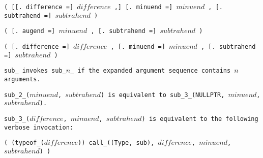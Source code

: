 
\s\s\s\tt{(} [[\tt{. difference =}] $difference$ \tt{,}]
[\tt{. minuend =}] $minuend$ \tt{,} [\tt{. subtrahend =}] $subtrahend$ \tt{)}

\s\tt{(} \phantom{[}[\tt{. augend =}]
$minuend$ \tt{,} [\tt{. subtrahend =}] $subtrahend$ \tt{)}

\s\tt{(} \phantom{[}[\tt{. difference =}] $difference$ \tt{,}\phantom{]}
[\tt{. minuend =}] $minuend$ \tt{,} [\tt{. subtrahend =}] $subtrahend$ \tt{)}


\tt{sub_} invokes \tt{sub_}$n$\_ if the
expanded argument sequence contains $n$ arguments.

\tt{sub_2_(}$minuend$\tt{,} $subtrahend$\tt{)} is equivalent to
\tt{sub_3_(NULLPTR,} $minuend$\tt{,} $subtrahend$\tt{)}.

\tt{sub_3_(}$difference$\tt{,} $minuend$\tt{,} $subtrahend$\tt{)}
is equivalent to the following verbose invocation:

\enlargethispage*{\baselineskip}
\begin{center}
\tt{( (typeof_(}$difference$\tt{)) call_((Type, sub),}
$difference$\tt{,} $minuend$\tt{,} $subtrahend$\tt{) )}
\end{center}
